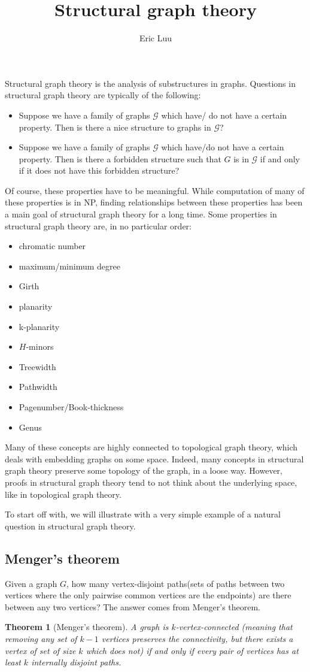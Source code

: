 \documentclass[]{article}
\title{Structural graph theory}
\author{Eric Luu}
\newtheorem{theorem}{Theorem}
\theoremstyle{definition}
\numberwithin{theorem}{section}
\numberwithin{equation}{section}
\begin{document}
Structural graph theory is the analysis of substructures in graphs. Questions in structural graph theory are typically of the following:

\begin{itemize}
	\item Suppose we have a family of graphs $\mathcal{G}$ which have/ do not have a certain property. Then is there a nice structure to graphs in $\mathcal{G}$?
	\item Suppose we have a family of graphs $\mathcal{G}$ which have/do not have a certain property. Then is there a forbidden structure such that $G$ is in $\mathcal{G}$ if and only if it does not have this forbidden structure?
\end{itemize}
Of course, these properties have to be meaningful. While computation of many of these properties is in NP, finding relationships between these properties has been a main goal of structural graph theory for a long time. 
Some properties in structural graph theory are, in no particular order:

\begin{itemize}
	\item chromatic number
	\item maximum/minimum degree
	\item Girth
	\item planarity
	\item k-planarity
	\item $H$-minors
	\item Treewidth
	\item Pathwidth
	\item Pagenumber/Book-thickness
	\item Genus
\end{itemize}
Many of these concepts are highly connected to topological graph theory, which deals with embedding graphs on some space. Indeed, many concepts in structural graph theory preserve some topology of the graph, in a loose way. However, proofs in structural graph theory tend to not think about the underlying space, like in topological graph theory.

To start off with, we will illustrate with a very simple example of a natural question in structural graph theory. 

\subsection{Menger's theorem}
Given a graph $G$, how many vertex-disjoint paths(sets of paths between two vertices where the only pairwise common vertices are the endpoints) are there between any two vertices? The answer comes from Menger's theorem.
\begin{theorem}[Menger's theorem]
	A graph is $k$-vertex-connected (meaning that removing any set of $k-1$ vertices preserves the connectivity, but there exists a vertex of set of size $k$ which does not) if and only if every pair of vertices has at least $k$ internally disjoint paths.
\end{theorem}
\end{document}
